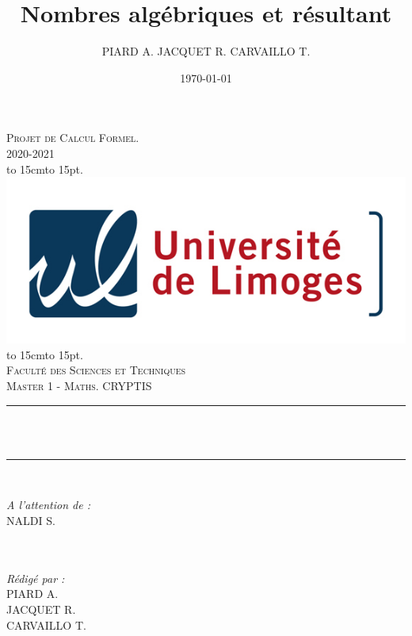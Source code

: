 \documentclass[12pt]{article}
\title{Nombres algébriques et résultant}
\author{\small PIARD A. JACQUET R. CARVAILLO T.}
\date{\today}
\makeatletter
\let\thetitle\@title
\def\dotfill#1{\cleaders\hbox to #1{.}\hfill}
\newcommand\dotline[2][.5em]{\leavevmode\hbox to #2{\dotfill{#1}\hfil}}
\theoremstyle{definition}\newtheorem{defn}{Définition}
\theoremstyle{definition}\newtheorem{exm}{Exemple}
\theoremstyle{definition}\newtheorem{rem}{Remarque}
\theoremstyle{definition}\newtheorem{algo}{Algorithme}
\theoremstyle{remark}\newtheorem{exo}{Exercice}
\theoremstyle{remark}\newtheorem{nota}{Notation}
\makeatother
\begin{document}

\begin{titlepage}
	\centering
    \vspace*{0.5 cm}
    \textsc{\LARGE Projet de Calcul Formel.\\
    \vspace{12pt}
2020-2021}\\[1.0 cm]
    \dotline[15pt]{15cm}\\
	\includegraphics[scale = 2.2]{logo.png}
	\dotline[15pt]{15cm}\\
	\vspace{1.5cm}
	\textsc{\Large Faculté des Sciences et Techniques}\\
	\textsc{\large Master 1 - Maths. CRYPTIS}\\[1.0 cm]
	\rule{\linewidth}{0.2 mm} \\[0.4 cm]
	{ \huge \bfseries \color{blue} \thetitle}\\
	\rule{\linewidth}{0.2 mm} \\[1.5 cm]
	
	\begin{minipage}{0.4\textwidth}
		\begin{flushleft} \large
			\emph{A l'attention de :}\\
			NALDI S.\\
			\phantom{a}\\
			\phantom{a}\\
		\end{flushleft}
	\end{minipage}
	\begin{minipage}{0.5\textwidth}
    	\begin{flushright} \large
		\emph{Rédigé par :}\\
		PIARD A.\\
		JACQUET R.\\
		CARVAILLO T.\\
		\end{flushright}
	\end{minipage}\\[2 cm]
\end{titlepage}
\end{document}
